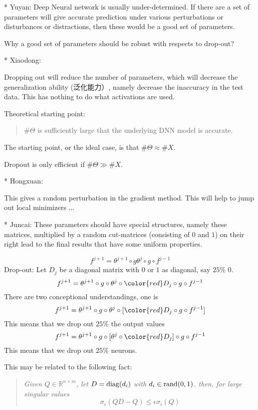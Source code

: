 *  Yuyan: Deep Neural network is usually under-determined.  If there are a set of parameters will give accurate prediction under various perturbations or disturbances or distractions,  then these would be a good set of parameters. 

Why a good set of parameters should be robust with respects to drop-out?

*  Xiaodong:  

Dropping out will reduce the number of parameters, which will decrease the generalization ability (泛化能力）, namely decrease the inaccuracy in the test data.   This has nothing to do what activations are used. 

Theoretical starting point:
\begin{quote}
$\#\Theta$ is sufficiently large that the underlying DNN model is accurate.
\end{quote}

The starting point, or the ideal case,  is that $\# \Theta \approx \# X$. 


Dropout is only efficient if $\# \Theta \gg \# X$.


* Hongxuan:  

This gives a random perturbation in the gradient method.  This will help to jump out local minimizers ... 

* Juncai:  These parameters should have special structures, namely these matrices, multiplied by a random cut-matrices (consisting of $0$ and $1$) on their right lead to the final results that have some uniform properties.


$$
f^{j+1}=\theta^{j+1}\circ g \theta^{j}\circ g \circ f^{j-1}
$$
Drop-out:  Let $D_j$ be a diagonal matrix with $0$ or $1$ as diagonal, say $25\%$ $0$. 
$$
f^{j+1}=\theta^{j+1}\circ g \circ \theta^{j}\circ {\color{red}D_j}\circ g \circ f^{j-1}
$$
There are two conceptional understandings, one is
$$
f^{j+1}=\theta^{j+1}\circ g \circ \theta^{j}\circ[ {\color{red}D_j}\circ g \circ f^{j-1}]
$$
This means that we drop out $25\%$ the output values
$$
f^{j+1}=\theta^{j+1}\circ g \circ [\theta^{j}\circ {\color{red}D_j}]\circ g \circ f^{j-1}
$$
This means that we drop out $25\%$ neurons. 

This may be related to the following fact:

\begin{quote}\it
Given $Q\in \mathbb R^{n\times m}$, let $D={\rm diag}(d_i)$ with $d_i\in {\rm rand}(0,1)$.  then, for large singular values
$$
\sigma_i(QD-Q)\le \epsilon \sigma_i(Q)
$$  
\end{quote}


